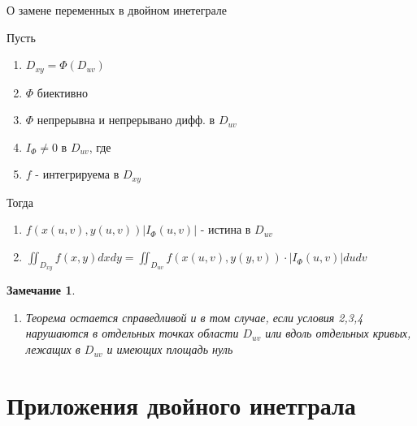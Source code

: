 \documentclass[a4paper, 14pt]{report}
\newtheorem{note}{Замечание}[chapter]
\begin{document}
    \begin{theorem}
        О замене переменных в двойном инетеграле

        Пусть

        \begin{enumerate}
            \item $D_{xy} = \Phi(D_{uv})$
            \item $\Phi$ биективно
            \item $\Phi$ непрерывна и непрерывано дифф. в $D_{uv}$
            \item $I_\Phi \ne 0$ в $D_{uv}$, где 
            \item $f$ - интегрируема в $D_{xy}$
        \end{enumerate}
        
        Тогда

        \begin{enumerate}
            \item $f(x(u,v), y(u,v)) |I_\Phi (u,v)|$ - истина в $D_{uv}$
            \item $\iint_{D_{xy}} f(x,y) dxdy = \iint_{D_{uv}} f(x(u,v), y(y,v)) \cdot |I_\Phi (u,v)| dudv$
        \end{enumerate}
    \end{theorem}

    \begin{note}
        \begin{enumerate}
            \item Теорема остается справедливой и в том случае, если условия 2,3,4 нарушаются в отдельных точках области $D_{uv}$ или вдоль отдельных кривых, лежащих в $D_{uv}$ и имеющих площадь нуль
        \end{enumerate}
    \end{note}

    \section{Приложения двойного инетграла}
\end{document}
